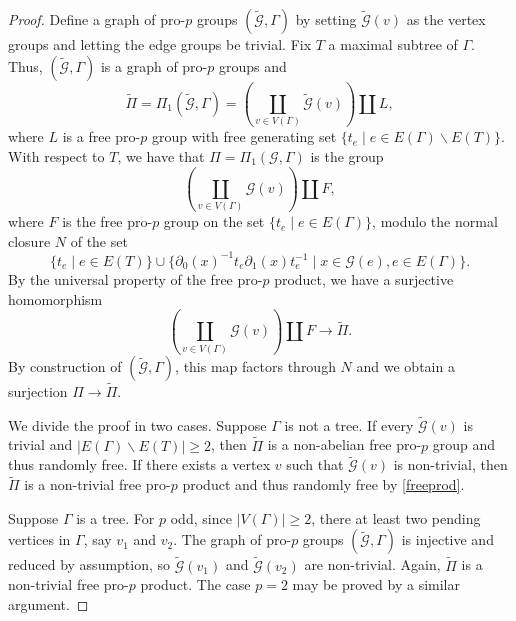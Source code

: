 \documentclass[a4paper,10pt]{amsart}
\theoremstyle{plain}
\theoremstyle{definition}
\numberwithin{equation}{section}
\begin{document}
\begin{proof}
    Define a graph of pro-$p$ groups $(\tilde{\mathcal G},\Gamma)$ by setting $\tilde{\mathcal G}(v)$ as the vertex groups and letting the edge groups be trivial. Fix $T$ a maximal subtree of $\Gamma$.
    Thus, $(\tilde{\mathcal G},\Gamma)$ is a graph of pro-$p$ groups and
    \[\tilde{\Pi} = \Pi_1(\tilde{\mathcal G},\Gamma) = \left( \coprod_{v \in V(\Gamma)} \tilde{\mathcal G}(v) \right) \amalg L,\]
    where $L$ is a free pro-$p$ group with free generating set $\{t_e \mid e \in E(\Gamma) \smallsetminus E(T)\}$. With respect to $T$, we have that $\Pi = \Pi_1(\mathcal G, \Gamma)$ is the group
    \[\left( \coprod_{v \in V(\Gamma)} \mathcal G(v) \right) \amalg F,\]
    where $F$ is the free pro-$p$ group on the set $\{t_e \mid e \in E(\Gamma)\}$, modulo the normal closure $N$ of the set
    \[\{t_e \mid e \in E(T)\} \cup \{\partial_0(x)^{-1}t_e\partial_1(x)t_e^{-1} \mid x \in \mathcal G(e), e\in E(\Gamma)\}.\]
    By the universal property of the free pro-$p$ product, we have a surjective homomorphism
    \[\left( \coprod_{v \in V(\Gamma)} \mathcal G(v) \right) \amalg F \to \tilde{\Pi}.\]
    By construction of $(\tilde{\mathcal G}, \Gamma)$, this map factors through $N$ and we obtain a surjection $\Pi \to \tilde{\Pi}$.

    We divide the proof in two cases. Suppose $\Gamma$ is not a tree. If every $\tilde{\mathcal G}(v)$ is trivial and $|E(\Gamma) \smallsetminus E(T)| \geq 2$, then $\tilde{\Pi}$ is a non-abelian free pro-$p$ group and thus randomly free. If there exists a vertex $v$ such that $\tilde{\mathcal G}(v)$ is non-trivial, then $\tilde{\Pi}$ is a non-trivial free pro-$p$ product and thus randomly free by \cref{freeprod}.

    Suppose $\Gamma$ is a tree. For $p$ odd, since $|V(\Gamma)| \geq 2$, there at least two pending vertices in $\Gamma$, say $v_1$ and $v_2$. The graph of pro-$p$ groups $(\tilde{\mathcal G},\Gamma)$ is injective and reduced by assumption, so $\tilde{\mathcal G}(v_1)$ and $\tilde{\mathcal G}(v_2)$ are non-trivial. Again, $\tilde{\Pi}$ is a non-trivial free pro-$p$ product.
    The case $p=2$ may be proved by a similar argument.
\end{proof}
\end{document}
